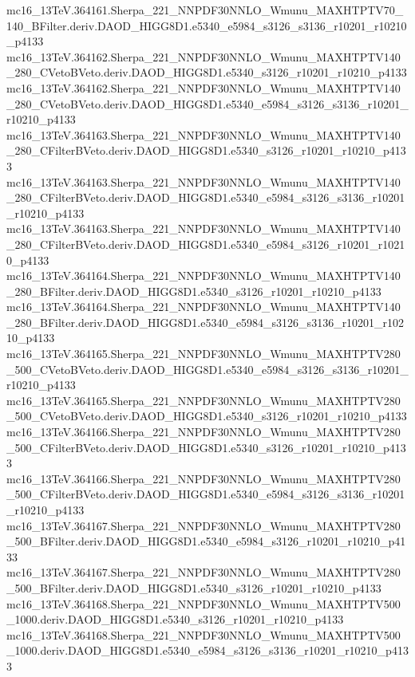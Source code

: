 mc16_13TeV.364161.Sherpa_221_NNPDF30NNLO_Wmunu_MAXHTPTV70_140_BFilter.deriv.DAOD_HIGG8D1.e5340_e5984_s3126_s3136_r10201_r10210_p4133 \\
mc16_13TeV.364162.Sherpa_221_NNPDF30NNLO_Wmunu_MAXHTPTV140_280_CVetoBVeto.deriv.DAOD_HIGG8D1.e5340_s3126_r10201_r10210_p4133 \\
mc16_13TeV.364162.Sherpa_221_NNPDF30NNLO_Wmunu_MAXHTPTV140_280_CVetoBVeto.deriv.DAOD_HIGG8D1.e5340_e5984_s3126_s3136_r10201_r10210_p4133 \\
mc16_13TeV.364163.Sherpa_221_NNPDF30NNLO_Wmunu_MAXHTPTV140_280_CFilterBVeto.deriv.DAOD_HIGG8D1.e5340_s3126_r10201_r10210_p4133 \\
mc16_13TeV.364163.Sherpa_221_NNPDF30NNLO_Wmunu_MAXHTPTV140_280_CFilterBVeto.deriv.DAOD_HIGG8D1.e5340_e5984_s3126_s3136_r10201_r10210_p4133 \\
mc16_13TeV.364163.Sherpa_221_NNPDF30NNLO_Wmunu_MAXHTPTV140_280_CFilterBVeto.deriv.DAOD_HIGG8D1.e5340_e5984_s3126_r10201_r10210_p4133 \\
mc16_13TeV.364164.Sherpa_221_NNPDF30NNLO_Wmunu_MAXHTPTV140_280_BFilter.deriv.DAOD_HIGG8D1.e5340_s3126_r10201_r10210_p4133 \\
mc16_13TeV.364164.Sherpa_221_NNPDF30NNLO_Wmunu_MAXHTPTV140_280_BFilter.deriv.DAOD_HIGG8D1.e5340_e5984_s3126_s3136_r10201_r10210_p4133 \\
mc16_13TeV.364165.Sherpa_221_NNPDF30NNLO_Wmunu_MAXHTPTV280_500_CVetoBVeto.deriv.DAOD_HIGG8D1.e5340_e5984_s3126_s3136_r10201_r10210_p4133 \\
mc16_13TeV.364165.Sherpa_221_NNPDF30NNLO_Wmunu_MAXHTPTV280_500_CVetoBVeto.deriv.DAOD_HIGG8D1.e5340_s3126_r10201_r10210_p4133 \\
mc16_13TeV.364166.Sherpa_221_NNPDF30NNLO_Wmunu_MAXHTPTV280_500_CFilterBVeto.deriv.DAOD_HIGG8D1.e5340_s3126_r10201_r10210_p4133 \\
mc16_13TeV.364166.Sherpa_221_NNPDF30NNLO_Wmunu_MAXHTPTV280_500_CFilterBVeto.deriv.DAOD_HIGG8D1.e5340_e5984_s3126_s3136_r10201_r10210_p4133 \\
mc16_13TeV.364167.Sherpa_221_NNPDF30NNLO_Wmunu_MAXHTPTV280_500_BFilter.deriv.DAOD_HIGG8D1.e5340_e5984_s3126_r10201_r10210_p4133 \\
mc16_13TeV.364167.Sherpa_221_NNPDF30NNLO_Wmunu_MAXHTPTV280_500_BFilter.deriv.DAOD_HIGG8D1.e5340_s3126_r10201_r10210_p4133 \\
mc16_13TeV.364168.Sherpa_221_NNPDF30NNLO_Wmunu_MAXHTPTV500_1000.deriv.DAOD_HIGG8D1.e5340_s3126_r10201_r10210_p4133 \\
mc16_13TeV.364168.Sherpa_221_NNPDF30NNLO_Wmunu_MAXHTPTV500_1000.deriv.DAOD_HIGG8D1.e5340_e5984_s3126_s3136_r10201_r10210_p4133 \\
